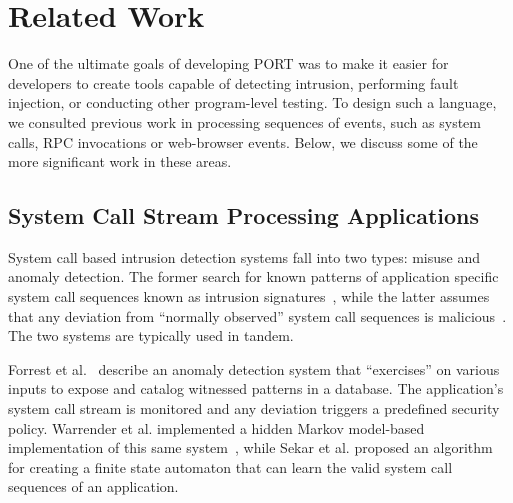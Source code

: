 \section{Related Work}
\label{SEC:related-work}

One of the ultimate goals of developing PORT
was to make it easier for developers to
create tools capable of detecting intrusion,
performing fault injection,
or conducting other program-level testing.
To design such a language,
we consulted
previous work
in processing sequences of events, such as
system calls, RPC invocations or
web-browser events.
Below, we discuss some of the more significant work in these areas.

\subsection{System Call Stream Processing Applications}

System call based intrusion detection systems fall into two types: misuse and anomaly detection.
The former search for known patterns of application specific
system call
sequences known as intrusion signatures~\cite{GARCIATEODORO200918}, while
the latter assumes that
any deviation
from ``normally observed'' system call sequences is
malicious~\cite{DBLP:conf/sp/ForrestHSL96}.
The two systems are typically used in tandem. 

Forrest et al.~\cite{DBLP:conf/sp/ForrestHSL96} describe
an anomaly detection system that
``exercises'' on various inputs to expose and catalog  witnessed patterns  in a database.
The application's system call stream
is monitored and any
deviation triggers a
predefined security policy.
Warrender et al. implemented a hidden Markov model-based implementation of this same system~\cite{DBLP:conf/sp/WarrenderFP99},
while
Sekar et al.\cite{DBLP:conf/sp/SekarBDB01} proposed
an algorithm
for creating a finite state automaton that can learn the valid system
call sequences of an application.


